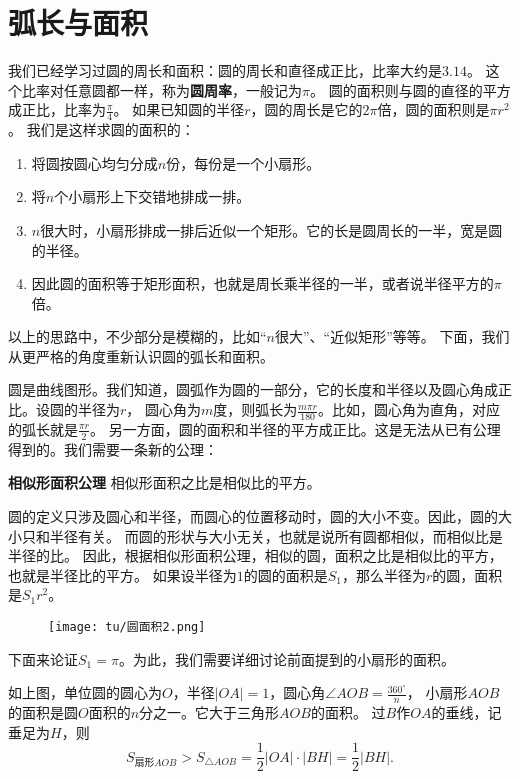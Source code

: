 \documentclass[12pt,UTF8]{ctexbook}
\begin{document}
\section{弧长与面积}
我们已经学习过圆的周长和面积：圆的周长和直径成正比，比率大约是$3.14$。
这个比率对任意圆都一样，称为\textbf{圆周率}，一般记为$\pi$。
圆的面积则与圆的直径的平方成正比，比率为$\frac{\pi}{4}$。
如果已知圆的半径$r$，圆的周长是它的$2\pi$倍，圆的面积则是$\pi r^2$。
我们是这样求圆的面积的：
\begin{enumerate}
    \item 将圆按圆心均匀分成$n$份，每份是一个小扇形。
    \item 将$n$个小扇形上下交错地排成一排。
    \item $n$很大时，小扇形排成一排后近似一个矩形。它的长是圆周长的一半，宽是圆的半径。
    \item 因此圆的面积等于矩形面积，也就是周长乘半径的一半，或者说半径平方的$\pi$倍。
\end{enumerate}

以上的思路中，不少部分是模糊的，比如“$n$很大”、“近似矩形”等等。
下面，我们从更严格的角度重新认识圆的弧长和面积。

圆是曲线图形。我们知道，圆弧作为圆的一部分，它的长度和半径以及圆心角成正比。设圆的半径为$r$，
圆心角为$m$度，则弧长为$\frac{m\pi r}{180}$。比如，圆心角为直角，对应的弧长就是$\frac{\pi r}{2}$。
另一方面，圆的面积和半径的平方成正比。这是无法从已有公理得到的。我们需要一条新的公理：

\begin{po}{\textbf{相似形面积公理}}
    相似形面积之比是相似比的平方。
\end{po}

圆的定义只涉及圆心和半径，而圆心的位置移动时，圆的大小不变。因此，圆的大小只和半径有关。
而圆的形状与大小无关，也就是说所有圆都相似，而相似比是半径的比。
因此，根据相似形面积公理，相似的圆，面积之比是相似比的平方，也就是半径比的平方。
如果设半径为$1$的圆的面积是$S_1$，那么半径为$r$的圆，面积是$S_1r^2$。

\begin{figure}[H] 
    \vspace{4pt}
    \centering
    \texttt{[image: tu/圆面积2.png]}
\end{figure}

下面来论证$S_1 = \pi$。为此，我们需要详细讨论前面提到的小扇形的面积。

如上图，单位圆的圆心为$O$，半径$|OA|=1$，圆心角$\angle AOB = \frac{360^\circ}{n}$，
小扇形$AOB$的面积是圆$O$面积的$n$分之一。它大于三角形$AOB$的面积。
过$B$作$OA$的垂线，记垂足为$H$，则
$$ S_{\text{扇形}AOB} > S_{\triangle AOB} = \frac12 |OA| \cdot |BH| = \frac12 |BH|. $$
\end{document}

